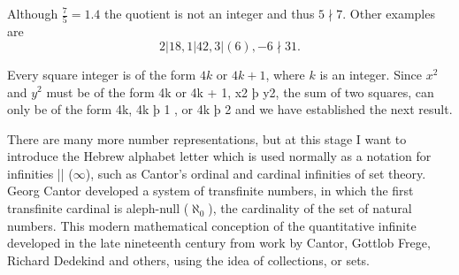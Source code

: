 Although $\frac{7}{5} = 1.4$ the quotient is not an integer and thus $5 \nmid 7$. Other examples are
\[2\vert 18, 1\vert 42, 3\vert(6), -6\nmid 31. \]


\begin{theorem} Every square integer is of the form $4k$ or $4k+1$, where $k$ is an integer.
Since $x^2$ and $y^2$ must be of the form 4k or 4k + 1, x2 þ y2, the sum of two
squares, can only be of the form 4k, 4k þ 1 , or 4k þ 2 and we have
established the next result.
\end{theorem}



There are many more number representations, but at this stage I want to introduce the Hebrew alphabet letter which is used normally as a notation for infinities |\infty| ($\infty$), such as Cantor's ordinal and cardinal infinities of set theory.  Georg Cantor developed a system of transfinite numbers, in which the first transfinite cardinal is aleph-null ($\aleph_0$), the cardinality of the set of natural numbers. This modern mathematical conception of the quantitative infinite developed in the late nineteenth century from work by Cantor, Gottlob Frege, Richard Dedekind and others, using the idea of collections, or sets.


